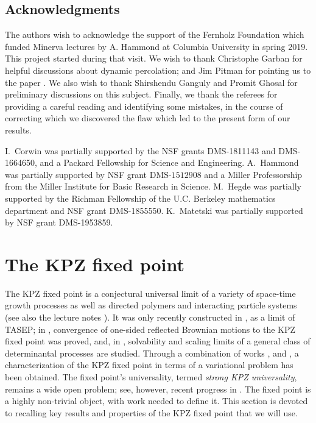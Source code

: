 \documentclass[oneside,final,11pt]{amsart}
\theoremstyle{definition}
\newcommand{\1}[1]{\mathbf{1}_{#1}}
\numberwithin{equation}{section}
\begin{document}


\subsection*{Acknowledgments}
The authors wish to acknowledge the support of the Fernholz Foundation which funded Minerva lectures by A. Hammond at Columbia University in spring 2019. This project started during that visit. We wish to thank Christophe Garban for helpful discussions about dynamic percolation; and Jim Pitman for pointing us to the paper \cite{millar1978path}. We also wish to thank Shirshendu Ganguly and Promit Ghosal for preliminary discussions on this subject.
Finally, we thank the referees for providing a careful reading and identifying some mistakes, in the course of correcting which we discovered the flaw which led to the present form of our results.

I.~Corwin was partially supported by the NSF grants DMS-1811143 and DMS-1664650, and a Packard Fellowship for Science and Engineering. A.~Hammond
 was partially supported by NSF grant DMS-$1512908$ and a Miller Professorship from the Miller Institute for Basic Research in Science.
M.~Hegde was partially supported by the Richman Fellowship of the U.C. Berkeley mathematics department and NSF grant DMS-1855550. K.~Matetski was partially supported by NSF grant DMS-1953859.



\section{The KPZ fixed point}
\label{sec:KPZ_fp}

The KPZ fixed point is a conjectural universal limit of a variety of space-time growth processes as well as directed polymers and interacting particle systems \cite{cqrFixedPt, corwinReview} (see also the lecture notes \cite{1710.02635}).
It was only recently constructed in \cite{fixedpt}, as a limit of TASEP; in \cite{NQR20}, convergence of one-sided reflected Brownian motions to the KPZ fixed point was proved, and, in \cite{TASEPandOthers}, solvability and scaling limits of a general class of determinantal processes are studied. Through a combination of works \cite{fixedpt},  \cite{Landscape} and \cite{NQR20}, a characterization of the KPZ fixed point in terms of a variational problem has been obtained. The fixed point's universality, termed {\it strong KPZ universality}, remains a wide open problem; see, however, recent progress in \cite{sarkar2020fixedpoint,virag2020fixedpoint}. The fixed point is a highly non-trivial object, with work needed to define it. This section is devoted to recalling key results and properties of the KPZ fixed point that we will use.
\end{document}
